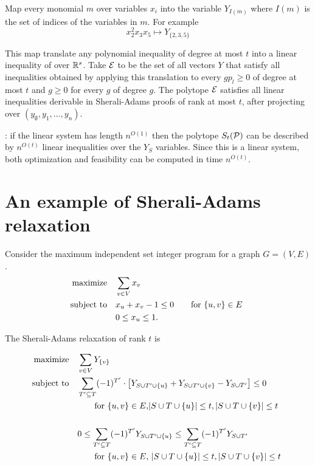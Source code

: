\documentclass[a4paper,twoside,justified]{tufte-handout}
\begin{document}
Map every monomial $m$ over variables $ x_{i} $ into the variable $
Y_{I(m)}$ where $ I(m) $ is the set of indices of the variables in $ m
$.  For example
\begin{equation*}
x^{2}_{2} x_{3}x_{5} \mapsto Y_{\{2,3,5\}} 
\end{equation*}

This map translate any polynomial inequality of degree at most $ t
$ into a linear inequality of over $ \mathbb{R}^{s} $. Take $ \mathcal{E} $ to be
the set of all vectors $ Y $ that satisfy all inequalities obtained by
applying this translation to every $ g p_{l} \geq 0$ of degree at most
$t$ and $ g \geq 0 $ for every $ g $ of degree $ g $. The polytope $
\mathcal{E} $ satisfies all linear inequalities derivable in Sherali-Adams
proofs of rank at most $ t $, after projecting over $
(y_{\emptyset},y_{1},\ldots,y_{n})$.


: if the linear system has length $
n^{O(1)} $ then the polytope $ S_{t}(\mathcal{P}) $ can be described by $
n^{O(t)} $ linear inequalities over the $ Y_{S} $ variables. Since
this is a linear system, both optimization and feasibility can be
computed in time $ n^{O(t)} $.

\section{An example of Sherali-Adams relaxation}

Consider the maximum independent set integer program for a graph $
G=(V,E)$.
\begin{alignat}{2}
  \text{maximize}\hspace{1em}& \sum_{v\in V} x_{v}\notag \\
  \text{subject to}\hspace{1em}& x_{u} + x_{v} - 1\leq 0 \qquad \text{for $ \{u,v\}\in E $ }\\
  & 0 \leq x_{u}\leq 1.\notag
\end{alignat}

The Sherali-Adams relaxation of rank $t$ is

\begin{alignat*}{2}
  \text{maximize}\hspace{1em}& \sum_{v\in V} Y_{\{v\}}\notag \\
  \text{subject to}\hspace{1em}& \sum_{T'\subseteq T} (-1)^{T'} \cdot 
  \left[ 
    Y_{S\cup T'\cup \{u\} } + Y_{S\cup T'\cup \{v\} } - Y_{S\cup T'}
  \right]
  \leq 0 \\ 
  &\qquad \text{for $ \{u,v\}\in E $,$ |S\cup T\cup \{u\}| \leq
    t,|S\cup T\cup \{v\}|\leq t $}\\
  \\
  &0 \leq \sum_{T'\subseteq T} (-1)^{T'} Y_{S\cup T'\cup \{u\} } \leq
  \sum_{T'\subseteq T} (-1)^{T'} Y_{S\cup T' }\\
  &\qquad \text{for $ \{u,v\}\in E $, $|S\cup T\cup \{u\}| \leq
    t,|S\cup T\cup \{v\}|\leq t $  }
\end{alignat*}


%

\end{document}
